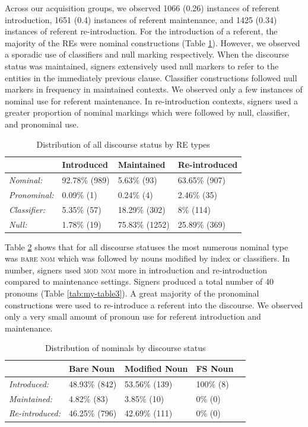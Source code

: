 \documentclass[]{elsarticle} %
\begin{document}
Across our acquisition groups, we observed 1066 (0.26) instances of
referent introduction, 1651 (0.4) instances of referent maintenance, and
1425 (0.34) instances of referent re-introduction. For the introduction
of a referent, the majority of the REs were nominal constructions (Table
\ref{tab:my-table}). However, we observed a sporadic use of classifiers
and null marking respectively. When the discourse status was maintained,
signers extensively used null markers to refer to the entities in the
immediately previous clause. Classifier constructions followed null
markers in frequency in maintained contexts. We observed only a few
instances of nominal use for referent maintenance. In re-introduction
contexts, signers used a greater proportion of nominal markings which
were followed by null, classifier, and pronominal use.

\begin{table}
\small
\caption{Distribution of all discourse status by RE types}
\label{tab:my-table}
\begin{tabular}{llll}
\hline
                     & Introduced    & Maintained     & Re-introduced \\ \hline
\textit{Nominal:}    & 92.78\% (989) & 5.63\% (93)    & 63.65\% (907) \\
\textit{Pronominal:} & 0.09\% (1)    & 0.24\% (4)     & 2.46\% (35)   \\
\textit{Classifier:} & 5.35\% (57)   & 18.29\% (302)  & 8\% (114)     \\
\textit{Null:}       & 1.78\% (19)   & 75.83\% (1252) & 25.89\% (369) \\ \hline
\end{tabular}%
\end{table}

Table \ref{tab:my-table2} shows that for all discourse statuses the most
numerous nominal type was \textsc{bare nom} which was followed by nouns
modified by index or classifiers. In number, signers used
\textsc{mod nom} more in introduction and re-introduction compared to
maintenance settings. Signers produced a total number of 40 pronouns
(Table \ref{tab:my-table3}). A great majority of the pronominal
constructions were used to re-introduce a referent into the discourse.
We observed only a very small amount of pronoun use for referent
introduction and maintenance.

\begin{table}
\small
\caption{Distribution of nominals by discourse status}
\label{tab:my-table2}
\begin{tabular}{lllll}
\hline
                        & Bare Noun  & Modified Noun & FS Noun \\ \hline
\textit{Introduced:}    & 48.93\% (842) & 53.56\% (139)     & 100\% (8) \\
\textit{Maintained:}    & 4.82\% (83)  & 3.85\% (10)      & 0\% (0) \\
\textit{Re-introduced:} & 46.25\% (796) & 42.69\% (111)     & 0\% (0) \\ \hline
\end{tabular}
\end{table}
\end{document}
